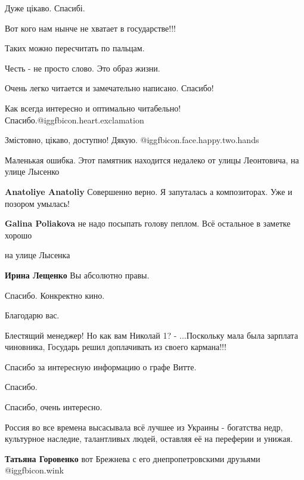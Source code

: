 \begin{itemize}
\begin{itemize}
\end{itemize} %

Дуже цікаво. Спасибі.

Вот кого нам нынче не хватает в государстве!!!

Таких можно пересчитать по пальцам.

Честь - не просто слово. Это образ жизни.

Очень легко читается и замечательно написано. Спасибо!

Как всегда интересно и оптимально читабельно! Спасибо.@igg{fbicon.heart.exclamation}

Змістовно, цікаво, доступно!
Дякую. @igg{fbicon.face.happy.two.hands} 

Маленькая ошибка. Этот памятник находится недалеко от улицы Леонтовича, на улице Лысенко

\begin{itemize} %
\textbf{Anatoliye Anatoliy} Совершенно верно. Я запуталась а композиторах. Уже и позором умылась!

\textbf{Galina Poliakova} не надо посыпать голову пеплом. Всё остальное в заметке хорошо
\end{itemize} %

на улице Лысенка

\textbf{Ирина Лещенко} Вы абсолютно правы.

Спасибо. Конкректно кино.

Благодарю вас.

Блестящий менеджер! Но как вам Николай 1? - ...Поскольку мала была зарплата
чиновника, Государь решил доплачивать из своего кармана!!!

Спасибо за интересную информацию о графе Витте.

Спасибо.

Спасибо, очень интересно.


Россия во все времена высасывала всё лучшее из Украины - богатства недр,
культурное наследие, талантливых людей, оставляя её на переферии и унижая.

\begin{itemize} %
\textbf{Татьяна Горовенко} вот Брежнева с его днепропетровскими друзьями  @igg{fbicon.wink} 


\end{itemize}
\end{itemize}
